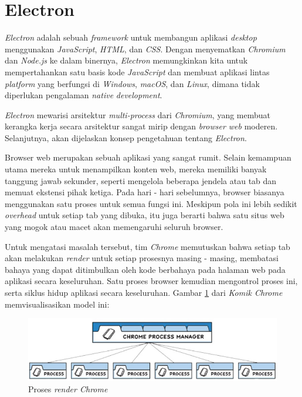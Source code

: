 \newpage
\section{Electron}
\textit{Electron} adalah sebuah \textit{framework} untuk membangun aplikasi \textit{desktop} menggunakan \textit{JavaScript}, \textit{HTML}, dan \textit{CSS}. Dengan menyematkan \textit{Chromium} dan \textit{Node.js} ke dalam binernya, \textit{Electron} memungkinkan kita untuk mempertahankan satu basis kode \textit{JavaScript} dan membuat aplikasi lintas \textit{platform} yang berfungsi di \textit{Windows}, \textit{macOS}, dan \textit{Linux}, dimana tidak diperlukan pengalaman \textit{native} \textit{development}. \cite{electron}

\textit{Electron} mewarisi arsitektur \textit{multi-process} dari \textit{Chromium}, yang membuat kerangka kerja secara arsitektur sangat mirip dengan \textit{browser web} moderen. Selanjutnya, akan dijelaskan konsep pengetahuan tentang \textit{Electron}. \cite{processModel}

Browser web merupakan sebuah aplikasi yang sangat rumit. Selain kemampuan utama mereka untuk menampilkan konten web, mereka memiliki banyak tanggung jawab sekunder, seperti mengelola beberapa jendela atau tab dan memuat ekstensi pihak ketiga. Pada hari - hari sebelumnya, browser biasanya menggunakan satu proses untuk semua fungsi ini. Meskipun pola ini lebih sedikit \textit{overhead} untuk setiap tab yang dibuka, itu juga berarti bahwa satu situs web yang mogok atau macet akan memengaruhi seluruh browser.

Untuk mengatasi masalah tersebut, tim \textit{Chrome} memutuskan  bahwa setiap tab akan melakukan \textit{render} untuk setiap prosesnya masing - masing, membatasi bahaya yang dapat ditimbulkan oleh kode berbahaya pada halaman web pada aplikasi secara keseluruhan. Satu proses browser kemudian mengontrol proses ini, serta siklus hidup aplikasi secara keseluruhan. Gambar \ref{fig:gambar15} dari \textit{Komik Chrome} memvisualisasikan model ini:

\begin{figure}[H]
    \centering
    \includegraphics[]{Gambar/Rendered Processes.jpg}
    \caption{Proses \textit{render Chrome}}
    \label{fig:gambar15}
\end{figure}


